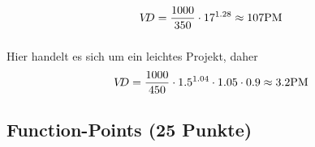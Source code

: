 \documentclass{scrartcl}
\begin{document}
\begin{equation*}
   V\kern-3ptD = \frac{1000}{350} \cdot 17^{1.28} \approx 107 \text{PM}
\end{equation*}

\subsubsection{}

Hier handelt es sich um ein leichtes Projekt, daher
\begin{equation*}
   V\kern-3ptD = \frac{1000}{450} \cdot 1.5^{1.04} \cdot 1.05 \cdot 0.9 \approx 3.2 \text{PM}
\end{equation*}
\subsection{Function-Points (25 Punkte)}
\end{document}
